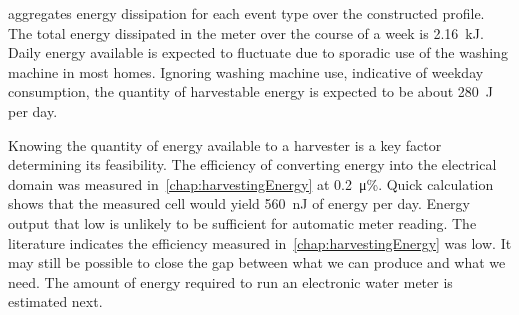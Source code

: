      aggregates energy dissipation for each event type over the constructed profile.
    The total energy dissipated in the meter over the course of a week is \SI{2.16}{\kilo\joule}.
    Daily energy available is expected to fluctuate due to sporadic use of the washing machine in most homes.
    Ignoring washing machine use, indicative of weekday consumption, the quantity of harvestable energy is expected to be about \SI{280}{\joule} per day.

    Knowing the quantity of energy available to a harvester is a key factor determining its feasibility.
    The efficiency of converting energy into the electrical domain was measured in~\cref{chap:harvestingEnergy} at \SI{0.2}{\micro\percent}.
    Quick calculation shows that the measured cell would yield \SI{560}{\nano\joule} of energy per day.
    Energy output that low is unlikely to be sufficient for automatic meter reading.
    The literature indicates the efficiency measured in~\cref{chap:harvestingEnergy} was low.
    It may still be possible to close the gap between what we can produce and what we need.
    The amount of energy required to run an electronic water meter is estimated next.
    

